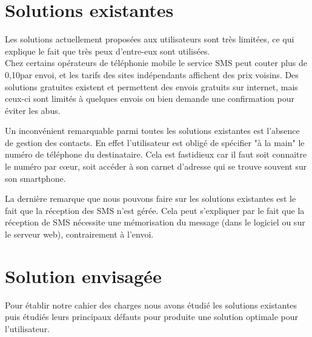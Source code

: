 \section{Solutions existantes}

Les solutions actuellement proposées aux utilisateurs sont très limitées, ce qui explique le fait que très peux d'entre-eux sont utilisées.
\\


Chez certains opérateurs de téléphonie mobile le service SMS peut couter plus de 0,10\texteuro par envoi, et les tarifs des sites indépendants affichent des prix voisins.
Des solutions gratuites existent et permettent des envois gratuits sur internet, mais ceux-ci sont limités à quelques envois ou bien demande une confirmation pour éviter les abus.

Un inconvénient remarquable parmi toutes les solutions existantes est l'absence de gestion des contacts.
En effet l'utilisateur est obligé de spécifier "à la main" le numéro de téléphone du destinataire.
Cela est fastidieux car il faut soit connaitre le numéro par cœur, soit accéder à son carnet d'adresse qui se trouve souvent sur son smartphone.

La dernière remarque que nous pouvons faire sur les solutions existantes est le fait que la réception des SMS n'est gérée.
Cela peut s'expliquer par le fait que la réception de SMS nécessite une mémorisation du message (dans le logiciel ou sur le serveur web), contrairement à l'envoi.
\\






\section{Solution envisagée}

Pour établir notre cahier des charges nous avons étudié les solutions existantes puis étudiés leurs principaux défauts pour produite une solution optimale pour l'utilisateur.
\\


